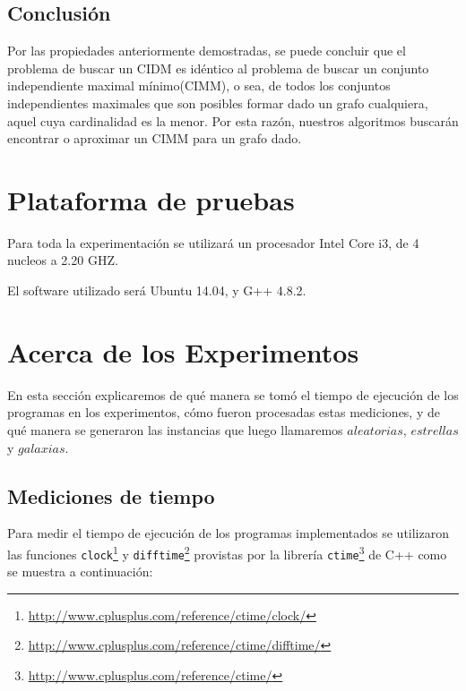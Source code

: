 \documentclass[a4paper]{article}
\begin{document}
\subsection{Conclusión}
Por las propiedades anteriormente demostradas, se puede concluir que el problema de buscar un CIDM es idéntico al problema de buscar un conjunto independiente maximal mínimo(CIMM), o sea, de todos los conjuntos independientes maximales que son posibles formar dado un grafo cualquiera, aquel cuya cardinalidad es la menor. Por esta razón, nuestros algoritmos buscarán encontrar o aproximar un CIMM para un grafo dado.

\vspace*{0.6cm}

\section{Plataforma de pruebas}

\vspace*{0.3cm}

Para toda la experimentación se utilizará un procesador Intel Core i3, de 4 nucleos a 2.20 GHZ.

El software utilizado será Ubuntu 14.04, y G++ 4.8.2.

\vspace*{0.6cm}

\section{Acerca de los Experimentos}

\vspace*{0.3cm}

En esta sección explicaremos de qué manera se tomó el tiempo de ejecución de los programas en los experimentos, cómo fueron procesadas estas mediciones, y de qué manera se generaron las instancias que luego llamaremos $aleatorias$, $estrellas$ y $galaxias$.

\subsection{Mediciones de tiempo}

Para medir el tiempo de ejecución de los programas implementados se utilizaron las funciones {\tt clock}\footnote{\url{http://www.cplusplus.com/reference/ctime/clock/}} y {\tt difftime}\footnote{\url{http://www.cplusplus.com/reference/ctime/difftime/}} provistas por la librería {\tt ctime}\footnote{\url{http://www.cplusplus.com/reference/ctime/}} de C++ como se muestra a continuación:
\end{document}
